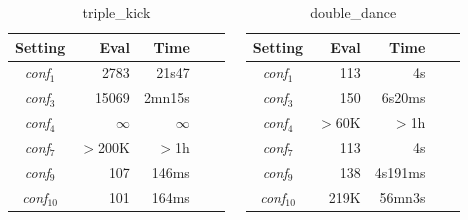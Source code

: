 \documentclass{beamer}
\begin{document}
{{\begin{columns}
\begin{table}
\center
\begin{tabular}{|c||r|r|r|r|}
\hline
Setting & Eval & Time \\
\hline
{\it conf}$_1$  & 2783  & 21s47 \\
{\it conf}$_3$  & 15069 & 2mn15s \\
{\it conf}$_4$  & $\infty$ & $\infty$ \\
{\it conf}$_7$  & $>$200K  & $>$1h \\
{\it conf}$_9$  & 107 & 146ms \\
{\it conf}$_{10}$  & 101 & 164ms \\
\hline
\end{tabular}
\caption{triple\_kick}
\label{table:triplekick}
\end{table}


\column{1.5in}


\begin{table}
\center
\begin{tabular}{|c||r|r|r|r|}
\hline
Setting & Eval & Time \\
\hline
{\it conf}$_1$  & 113  & 4s \\
{\it conf}$_3$  & 150  & 6s20ms \\
{\it conf}$_4$  & $>$60K & $>$1h \\ 
{\it conf}$_7$  & 113  & 4s \\
{\it conf}$_9$  & 138 & 4s191ms \\
{\it conf}$_{10}$  & 219K & 56mn3s \\
\hline
\end{tabular}
\caption{double\_dance}
\label{table:doubledance}
\end{table}

\end{columns}

}

}
\end{document}
